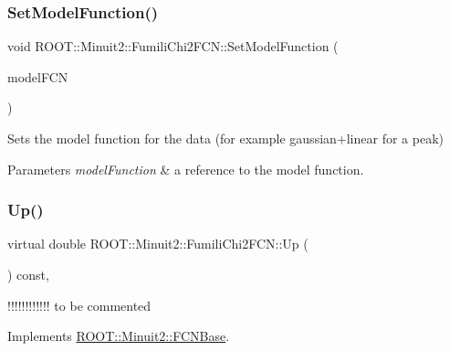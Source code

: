 \subsubsection{\texorpdfstring{SetModelFunction()}{SetModelFunction()}\hspace{0.1cm}{\footnotesize\ttfamily [3/3]}}
{\footnotesize\ttfamily void R\+O\+O\+T\+::\+Minuit2\+::\+Fumili\+Chi2\+F\+C\+N\+::\+Set\+Model\+Function (\begin{DoxyParamCaption}\item[{const \mbox{\hyperlink{classROOT_1_1Minuit2_1_1ParametricFunction}{Parametric\+Function}} \&}]{model\+F\+CN }\end{DoxyParamCaption})\hspace{0.3cm}{\ttfamily [inline]}}

Sets the model function for the data (for example gaussian+linear for a peak)


\begin{DoxyParams}{Parameters}
{\em model\+Function} & a reference to the model function. \\
\hline
\end{DoxyParams}
\mbox{\label{classROOT_1_1Minuit2_1_1FumiliChi2FCN_a7e68bc2b2eb631ec52b753d7d49c4414}} 
\subsubsection{\texorpdfstring{Up()}{Up()}\hspace{0.1cm}{\footnotesize\ttfamily [1/3]}}
{\footnotesize\ttfamily virtual double R\+O\+O\+T\+::\+Minuit2\+::\+Fumili\+Chi2\+F\+C\+N\+::\+Up (\begin{DoxyParamCaption}{ }\end{DoxyParamCaption}) const\hspace{0.3cm}{\ttfamily [inline]}, {\ttfamily [virtual]}}

!!!!!!!!!!!! to be commented 

Implements \mbox{\hyperlink{classROOT_1_1Minuit2_1_1FCNBase_a04ef08ddad92ce8d89d498efbe021c39}{R\+O\+O\+T\+::\+Minuit2\+::\+F\+C\+N\+Base}}.

\mbox{\label{classROOT_1_1Minuit2_1_1FumiliChi2FCN_a7e68bc2b2eb631ec52b753d7d49c4414}} 
